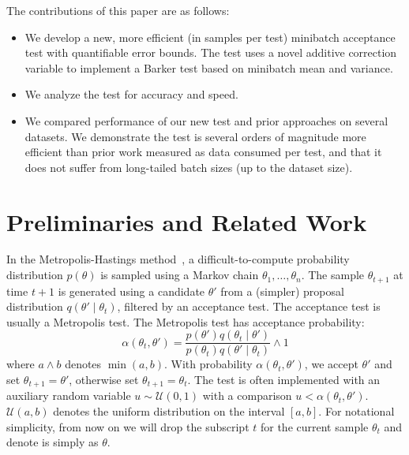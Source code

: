 \documentclass{article}
\begin{document}
The contributions of this paper are as follows:

\begin{itemize}
\item We develop a new, more efficient (in samples per test) minibatch acceptance test with quantifiable error bounds. The test
  uses a novel additive correction variable to implement a Barker test based on minibatch mean and variance. 
\item We analyze the test for accuracy and speed.
\item We compared performance of our new test and prior approaches on several datasets. We demonstrate the test is several orders
  of magnitude more efficient than prior work measured as data consumed per test, and that it does not suffer
  from long-tailed batch sizes (up to the dataset size). 
\end{itemize}




\section{Preliminaries and Related Work}\label{sec:related_work}

In the Metropolis-Hastings method~\cite{gilks1996markov,brooks2011handbook}, a difficult-to-compute
probability distribution $p(\theta)$ is sampled using a Markov chain $\theta_1,\ldots,\theta_n$. The 
sample $\theta_{t+1}$ at time $t+1$ is generated using a candidate $\theta'$ from a (simpler) proposal
distribution $q(\theta'\mid \theta_t)$, filtered by an acceptance test. The acceptance test is usually
a Metropolis test. The Metropolis test has acceptance probability:
\begin{equation}\label{eq:traditional}
\alpha(\theta_t,\theta') = \frac{p(\theta')q(\theta_t \mid \theta')}{p(\theta_t)q(\theta' \mid \theta_t)} \wedge 1
\end{equation}
where $a \wedge b$ denotes $\min(a,b)$.  With probability $\alpha(\theta_t,\theta')$, we accept $\theta'$
and set $\theta_{t+1} = \theta'$, otherwise set
$\theta_{t+1}=\theta_t$.  The test is often implemented with an
auxiliary random variable $u \sim \mathcal{U}(0,1)$ with a comparison $u < \alpha(\theta_t,\theta')$. $\mathcal{U}(a,b)$ denotes the uniform distribution on the interval $[a,b]$. 
For notational simplicity, from now on we will drop the subscript $t$ for the current sample $\theta_t$ and
denote is simply as $\theta$. 
\end{document}
